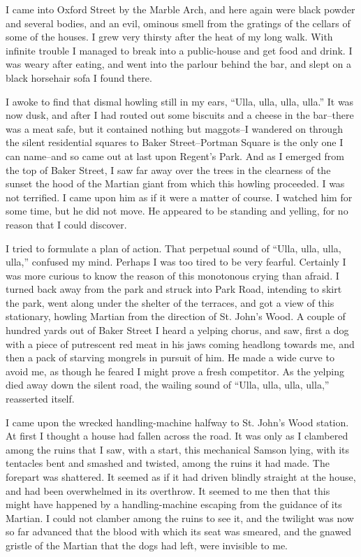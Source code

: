 I came into Oxford Street by the Marble Arch, and here again were
black powder and several bodies, and an evil, ominous smell from
the gratings of the cellars of some of the houses. I grew very
thirsty after the heat of my long walk. With infinite trouble I
managed to break into a public-house and get food and drink. I was
weary after eating, and went into the parlour behind the bar, and
slept on a black horsehair sofa I found there.

I awoke to find that dismal howling still in my ears, ``Ulla, ulla,
ulla, ulla.'' It was now dusk, and after I had routed out some
biscuits and a cheese in the bar--there was a meat safe, but it
contained nothing but maggots--I wandered on through the silent
residential squares to Baker Street--Portman Square is the only one
I can name--and so came out at last upon Regent's Park. And as I
emerged from the top of Baker Street, I saw far away over the trees
in the clearness of the sunset the hood of the Martian giant from
which this howling proceeded. I was not terrified. I came upon him
as if it were a matter of course. I watched him for some time, but
he did not move. He appeared to be standing and yelling, for no
reason that I could discover.

I tried to formulate a plan of action. That perpetual sound of
``Ulla, ulla, ulla, ulla,'' confused my mind. Perhaps I was too tired
to be very fearful. Certainly I was more curious to know the reason
of this monotonous crying than afraid. I turned back away from the
park and struck into Park Road, intending to skirt the park, went
along under the shelter of the terraces, and got a view of this
stationary, howling Martian from the direction of St. John's Wood.
A couple of hundred yards out of Baker Street I heard a yelping
chorus, and saw, first a dog with a piece of putrescent red meat in
his jaws coming headlong towards me, and then a pack of starving
mongrels in pursuit of him. He made a wide curve to avoid me, as
though he feared I might prove a fresh competitor. As the yelping
died away down the silent road, the wailing sound of ``Ulla, ulla,
ulla, ulla,'' reasserted itself.

I came upon the wrecked handling-machine halfway to St. John's Wood
station. At first I thought a house had fallen across the road. It
was only as I clambered among the ruins that I saw, with a start,
this mechanical Samson lying, with its tentacles bent and smashed
and twisted, among the ruins it had made. The forepart was
shattered. It seemed as if it had driven blindly straight at the
house, and had been overwhelmed in its overthrow. It seemed to me
then that this might have happened by a handling-machine escaping
from the guidance of its Martian. I could not clamber among the
ruins to see it, and the twilight was now so far advanced that the
blood with which its seat was smeared, and the gnawed gristle of
the Martian that the dogs had left, were invisible to me.

